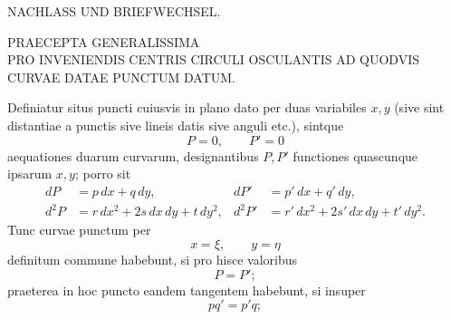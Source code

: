 %
\begin{center}
{\large NACHLASS UND BRIEFWECHSEL.\par}
\bigskip
PRAECEPTA GENERALISSIMA\\
PRO INVENIENDIS CENTRIS CIRCULI OSCULANTIS AD QUODVIS CURVAE DATAE PUNCTUM DATUM.
\end{center}

Definiatur situs puncti cuiusvis in plano dato per duas variabiles $x,y$ (sive sint distantiae a punctis sive lineis datis sive anguli etc.), sintque
\[
P=0,\qquad P'=0
\]
aequationes duarum curvarum, designantibus $P,P'$ functiones quascunque ipsarum $x,y$; porro sit
\[
\begin{aligned}
dP&=p\,dx+q\,dy,&dP'&=p'\,dx+q'\,dy,\\
d^2P&=r\,dx^2+2s\,dx\,dy+t\,dy^2,&d^2P'&=r'\,dx^2+2s'\,dx\,dy+t'\,dy^2.
\end{aligned}
\]
Tunc curvae punctum per
\[
x=\xi,\qquad y=\eta
\]
definitum commune habebunt, si pro hisce valoribus
\[
P=P';
\]
praeterea in hoc puncto eandem tangentem habebunt, si insuper
\[
pq'=p'q;
\]
